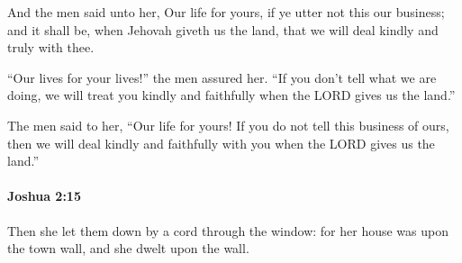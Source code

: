 			\begin{versebox}
					\item[BHS] 
					\item[ASV] And the men said unto her, Our life for yours, if ye utter not this our business; and it shall be, when Jehovah giveth us the land, that we will deal kindly and truly with thee.
					\item[NIV] “Our lives for your lives!” the men assured her. “If you don’t tell what we are doing, we will treat you kindly and faithfully when the LORD gives us the land.”
					\item[NRSV] The men said to her, “Our life for yours! If you do not tell this business of ours, then we will deal kindly and faithfully with you when the LORD gives us the land.”
			\end{versebox}

		\paragraph{Joshua 2:15} %
			\label{JOSHUA-2-15}

			Then she let them down by a cord through the window: for her house was upon the town wall, and she dwelt upon the wall.

